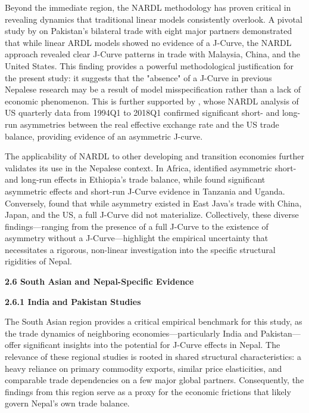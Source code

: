 \documentclass[12pt]{article}
\begin{document}
Beyond the immediate region, the NARDL methodology has proven critical in revealing dynamics that traditional linear models consistently overlook. A pivotal study by \textcite{Iqbal2021-pu} on Pakistan’s bilateral trade with eight major partners demonstrated that while linear ARDL models showed no evidence of a J-Curve, the NARDL approach revealed clear J-Curve patterns in trade with Malaysia, China, and the United States. This finding provides a powerful methodological justification for the present study: it suggests that the "absence" of a J-Curve in previous Nepalese research may be a result of model misspecification rather than a lack of economic phenomenon. This is further supported by \textcite{Nasir2021-xt}, whose NARDL analysis of US quarterly data from 1994Q1 to 2018Q1 confirmed significant short- and long-run asymmetries between the real effective exchange rate and the US trade balance, providing evidence of an asymmetric J-curve.

The applicability of NARDL to other developing and transition economies further validates its use in the Nepalese context. In Africa, \textcite{Abegaz2024-wp} identified asymmetric short- and long-run effects in Ethiopia’s trade balance, while \textcite{Albiman2022-fo} found significant asymmetric effects and short-run J-Curve evidence in Tanzania and Uganda. Conversely, \textcite{Pertiwi2024-me} found that while asymmetry existed in East Java’s trade with China, Japan, and the US, a full J-Curve did not materialize. Collectively, these diverse findings—ranging from the presence of a full J-Curve to the existence of asymmetry without a J-Curve—highlight the empirical uncertainty that necessitates a rigorous, non-linear investigation into the specific structural rigidities of Nepal.

\vspace{0.5cm}
\noindent\textbf{2.6 South Asian and Nepal-Specific Evidence}

\noindent\textbf{2.6.1 India and Pakistan Studies}

The South Asian region provides a critical empirical benchmark for this study, as the trade dynamics of neighboring economies—particularly India and Pakistan—offer significant insights into the potential for J-Curve effects in Nepal. The relevance of these regional studies is rooted in shared structural characteristics: a heavy reliance on primary commodity exports, similar price elasticities, and comparable trade dependencies on a few major global partners. Consequently, the findings from this region serve as a proxy for the economic frictions that likely govern Nepal's own trade balance.
\end{document}
